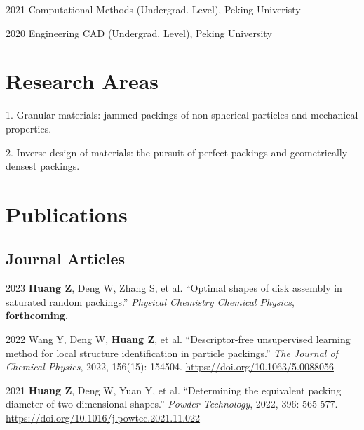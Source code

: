 \documentclass[12pt,letterpaper]{report}
\newcommand{\listitemspace}{0.25em}
\renewenvironment{itemize}
{\begin{list}{}{\setlength{\leftmargin}{0em}
                \setlength{\parskip}{0em}
                \setlength{\itemsep}{\listitemspace}
                \setlength{\parsep}{\listitemspace}}}
{\end{list}}
\begin{document}
	\begin{tablist}

		\item[2021] \tab{}Computational Methods (Undergrad. Level), Peking Univeristy

		\item[2020] \tab{}Engineering CAD (Undergrad. Level), Peking University

	\end{tablist}

    \section*{Research Areas}

    \begin{itemize}

        \item 1. Granular materials: jammed packings of non-spherical particles and mechanical properties.
        \item 2. Inverse design of materials: the pursuit of perfect packings and geometrically densest packings.

    \end{itemize}



    



	\section*{Publications}
	
	\subsection*{Journal Articles}
	
	\begin{tablist}
		
		\item[2023] \tab{}\textbf{Huang Z}, Deng W, Zhang S, et al. \enquote{Optimal shapes of disk assembly in saturated random packings.} \textit{Physical Chemistry Chemical Physics}, \textbf{forthcoming}.
		
		\item[2022] \tab{}Wang Y, Deng W, \textbf {Huang Z}, et al. \enquote{Descriptor-free unsupervised learning method for local structure identification in particle packings.} \textit{The Journal of Chemical Physics}, 2022, 156(15): 154504. \href{https://doi.org/10.1063/5.0088056}{https://doi.org/10.1063/5.0088056}
		
		\item[2021] \tab{}\textbf{Huang Z}, Deng W, Yuan Y, et al. \enquote{Determining the equivalent packing diameter of two-dimensional shapes.} \textit{Powder Technology}, 2022, 396: 565-577. \href{https://doi.org/10.1016/j.powtec.2021.11.022}{https://doi.org/10.1016/j.powtec.2021.11.022}
		
		
	\end{tablist}
	
\end{document}
